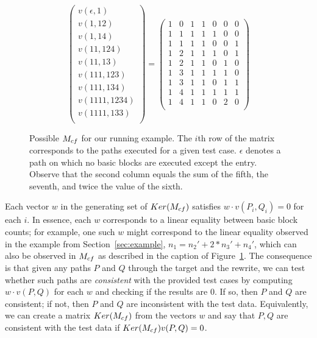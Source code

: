 \begin{figure}
\begin{equation*}
\begin{pmatrix}
v(\epsilon, 1)\\
v(1, 12)\\
v(1, 14)\\
v(11, 124)\\
v(11, 13)\\
v(111, 123)\\
v(111, 134)\\
v(1111, 1234)\\
v(1111, 133)\\
\end{pmatrix}
=
\begin{pmatrix}
1 & 0 & 1 & 1 & 0 & 0 & 0 \\
1 & 1 & 1 & 1 & 1 & 0 & 0 \\
1 & 1 & 1 & 1 & 0 & 0 & 1 \\
1 & 2 & 1 & 1 & 1 & 0 & 1 \\
1 & 2 & 1 & 1 & 0 & 1 & 0 \\
1 & 3 & 1 & 1 & 1 & 1 & 0 \\
1 & 3 & 1 & 1 & 0 & 1 & 1 \\
1 & 4 & 1 & 1 & 1 & 1 & 1 \\
1 & 4 & 1 & 1 & 0 & 2 & 0 \\
\end{pmatrix}
\end{equation*}
\caption{Possible $M_{cf}$ for our running example. The
$i$th row of the matrix corresponds to the paths executed for a given
test case. $\epsilon$ denotes a path on which no basic blocks are
executed except the entry. Observe that the second column equals the
sum of the fifth, the seventh, and twice the value of the sixth.}
\label{fig:eg-controlflowmatrix}
\end{figure}

Each vector $w$ in the generating set of $Ker(M_{cf})$
satisfies $w \cdot v(P_i, Q_i) = 0$ for each $i$. In essence, each
$w$ corresponds to a linear equality between basic block counts;
for example, one such $w$ might correspond to the linear equality
observed in the example from Section~\ref{sec:example}, $n_1 = n_2'
+ 2*n_3' + n_4'$, which can also be observed in $M_{cf}$
as described in the caption of Figure~\ref{fig:eg-controlflowmatrix}.
The consequence is that given any paths $P$ and $Q$ through the target
and the rewrite, we can test whether such paths are \emph{consistent}
with the provided test cases by computing $w\cdot v(P,Q)$ for each
$w$ and checking if the results are 0. If so, then $P$ and $Q$ are
consistent; if not, then $P$ and $Q$ are inconsistent with the test
data. Equivalently, we can create a matrix $Ker(M_{cf})$
from the vectors $w$ and say that $P,Q$ are consistent with the test
data if $Ker(M_{cf}) v(P,Q) = 0$.

